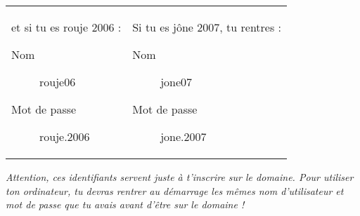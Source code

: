 
\begin{center}
\begin{tabular}{ll}
 \parbox{.45\textwidth}{
  et si tu es rouje 2006 :
  \begin{description}
    \item[Nom] rouje06
    \item[Mot de passe] rouje.2006
  \end{description}
  }
 & \parbox{.45\textwidth}{
  Si tu es j\^one 2007, tu rentres :
  \begin{description}
    \item[Nom] jone07
    \item[Mot de passe] jone.2007
  \end{description}
  }
\\
\end{tabular}
\end{center}

\emph{Attention, ces identifiants servent juste \`a t'inscrire sur le
domaine. Pour utiliser ton ordinateur, tu devras rentrer au
d\'emarrage les m\^emes nom d'utilisateur et mot de passe que tu avais
avant d'\^etre sur le domaine !}







